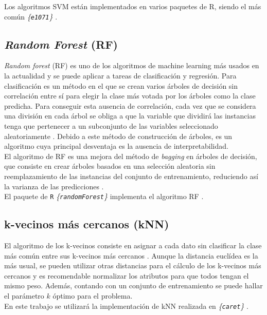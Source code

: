 Los algoritmos SVM están implementados en varios paquetes de R, siendo el más común \textit{\{\texttt{e1071}\}} \cite{Meyer2019}.

\subsection{\textit{Random Forest} (RF)}

\textit{Random forest} (RF) es uno de los algoritmos de machine learning más usados en la actualidad y se puede aplicar a tareas de clasificación y regresión. Para clasificación es un método en el que se crean varios árboles de decisión sin correlación entre sí para elegir la clase más votada por los árboles como la clase predicha. Para conseguir esta ausencia de correlación, cada vez que se considera una división en cada árbol se obliga a que la variable que dividirá las instancias tenga que pertenecer a un subconjunto de las variables seleccionado aleatoriamente \cite{Breiman2001, Breiman2002}. Debido a este método de construcción de árboles, es un algoritmo cuya principal desventaja es la ausencia de interpretabilidad.\\

El algoritmo de RF es una mejora del método de \textit{bagging} en árboles de decisión, que consiste en crear árboles basados en una selección aleatoria sin reemplazamiento de las instancias del conjunto de entrenamiento, reduciendo así la varianza de las predicciones \cite{Breiman1996}.\\

El paquete de \texttt{R} \textit{\{\texttt{randomForest}\}} implementa el algoritmo RF \cite{Liaw2002}.

\subsection{k-vecinos más cercanos (kNN)}

El algoritmo de los k-vecinos consiste en asignar a cada dato sin clasificar la clase más común entre sus k-vecinos más cercanos \cite{Altman1992}. Aunque la distancia euclídea es la más usual, se pueden utilizar otras distancias para el cálculo de los k-vecinos más cercanos \cite{Hu2016} y es recomendable normalizar los atributos para que todos tengan el mismo peso. Además, contando con un conjunto de entrenamiento se puede hallar el parámetro $k$ óptimo para el problema.\\

En este trabajo se utilizará la implementación de kNN realizada en \textit{\{\texttt{caret}\}} \cite{Kuhn2020}.

